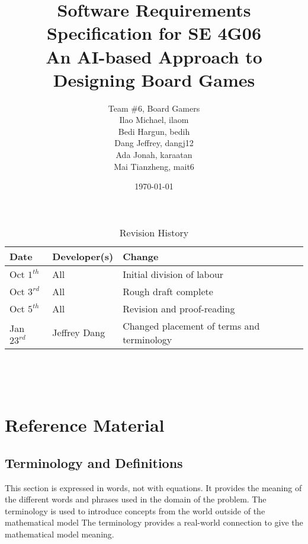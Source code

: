 \documentclass[12pt]{article}
\begin{document}
\begin{table}[hp]
\caption{Revision History} \label{TblRevisionHistory}
\begin{tabularx}{\textwidth}{llX}
\toprule
\textbf{Date} & \textbf{Developer(s)} & \textbf{Change}\\
\midrule
Oct $1^{th}$ & All & Initial division of labour\\
Oct $3^{rd}$ & All & Rough draft complete\\
Oct $5^{th}$ & All & Revision and proof-reading \\
Jan $23^{rd}$ & Jeffrey Dang & Changed placement of terms and terminology \\
\bottomrule
\end{tabularx}
\end{table}
\newpage

\title{Software Requirements Specification for SE 4G06 \\ An AI-based Approach to Designing Board Games} 
\author{Team \#6, Board Gamers
\\ Ilao Michael, ilaom
\\ Bedi Hargun, bedih
\\ Dang Jeffrey, dangj12
\\ Ada Jonah, karaatan
\\ Mai Tianzheng, mait6}
\date{\today}
	
\maketitle

~\newpage


\tableofcontents

~\newpage

\section{Reference Material}

\subsection{Terminology and  Definitions}
This section is expressed in words, not with equations.  It provides the meaning of the different words and phrases used in the domain of the problem.
The terminology is used to introduce concepts from the world outside of the
mathematical model  The terminology provides a real-world connection to give the
mathematical model meaning.
\end{document}
